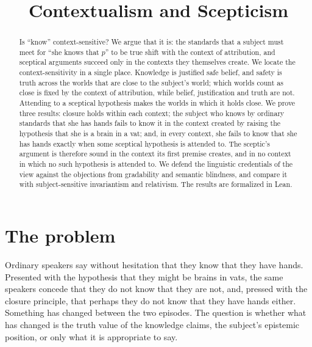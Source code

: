 \documentclass{situationist-preprint}
\title{Contextualism and Scepticism}
\begin{document}
\maketitle

\begin{abstract}
Is \enquote{know} context-sensitive? We argue that it is: the standards that a subject must meet for \enquote{she knows that $p$} to be true shift with the context of attribution, and sceptical arguments succeed only in the contexts they themselves create. We locate the context-sensitivity in a single place. Knowledge is justified safe belief, and safety is truth across the worlds that are close to the subject's world; which worlds count as close is fixed by the context of attribution, while belief, justification and truth are not. Attending to a sceptical hypothesis makes the worlds in which it holds close. We prove three results: closure holds within each context; the subject who knows by ordinary standards that she has hands fails to know it in the context created by raising the hypothesis that she is a brain in a vat; and, in every context, she fails to know that she has hands exactly when some sceptical hypothesis is attended to. The sceptic's argument is therefore sound in the context its first premise creates, and in no context in which no such hypothesis is attended to. We defend the linguistic credentials of the view against the objections from gradability and semantic blindness, and compare it with subject-sensitive invariantism and relativism. The results are formalized in Lean.
\end{abstract}

\section{The problem}

Ordinary speakers say without hesitation that they know that they have hands. Presented with the hypothesis that they might be brains in vats, the same speakers concede that they do not know that they are not, and, pressed with the closure principle, that perhaps they do not know that they have hands either. Something has changed between the two episodes. The question is whether what has changed is the truth value of the knowledge claims, the subject's epistemic position, or only what it is appropriate to say.
\end{document}
